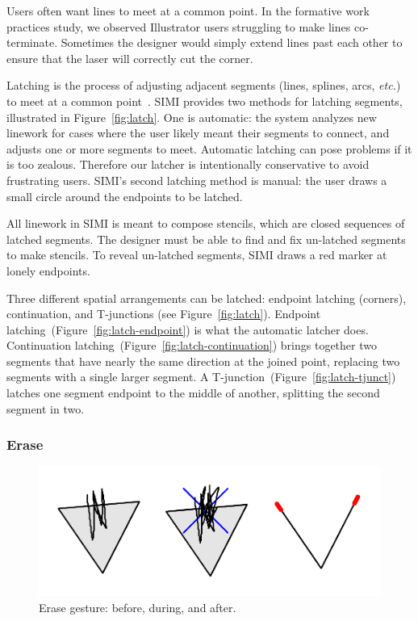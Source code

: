 \documentclass{article}
\begin{document}
Users often want lines to meet at a common point. In the formative
work practices study, we observed Illustrator users struggling to make
lines co-terminate. Sometimes the designer would simply extend lines
past each other to ensure that the laser will correctly cut the
corner.

Latching is the process of adjusting adjacent segments (lines,
splines, arcs, \textit{etc.}) to meet at a common
point~\cite{herot-latch-corners}. SIMI provides two methods for
latching segments, illustrated in Figure~\ref{fig:latch}. One is
automatic: the system analyzes new linework for cases where the user
likely meant their segments to connect, and adjusts one or more
segments to meet. Automatic latching can pose problems if it is too
zealous. Therefore our latcher is intentionally conservative to avoid
frustrating users. SIMI's second latching method is manual: the user
draws a small circle around the endpoints to be latched.

All linework in SIMI is meant to compose stencils, which are closed
sequences of latched segments. The designer must be able to find and
fix un-latched segments to make stencils. To reveal un-latched
segments, SIMI draws a red marker at lonely endpoints.

Three different spatial arrangements can be latched: endpoint latching
(corners), continuation, and T-junctions (see
Figure~\ref{fig:latch}). Endpoint
latching~(Figure~\ref{fig:latch-endpoint}) is what the automatic
latcher does. Continuation
latching~(Figure~\ref{fig:latch-continuation}) brings together two
segments that have nearly the same direction at the joined point,
replacing two segments with a single larger segment. A
T-junction~(Figure~\ref{fig:latch-tjunct}) latches one segment
endpoint to the middle of another, splitting the second segment in
two.

\subsubsection{Erase}

\begin{figure}[h]
  \centering
  \includegraphics[width=0.9\linewidth]{img/erase-all.pdf}
  \caption{Erase gesture: before, during, and after.}
  \label{fig:erase}
\end{figure}
\end{document}
